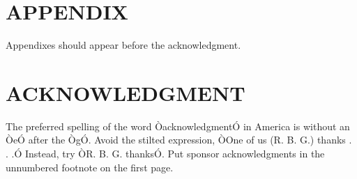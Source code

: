 \documentclass[letterpaper, 10 pt, conference]{ieeeconf}  %
\begin{document}

\section*{APPENDIX}

Appendixes should appear before the acknowledgment.

\section*{ACKNOWLEDGMENT}

The preferred spelling of the word ÒacknowledgmentÓ in America is without an ÒeÓ after the ÒgÓ. Avoid the stilted expression, ÒOne of us (R. B. G.) thanks . . .Ó  Instead, try ÒR. B. G. thanksÓ. Put sponsor acknowledgments in the unnumbered footnote on the first page.






\end{document}
